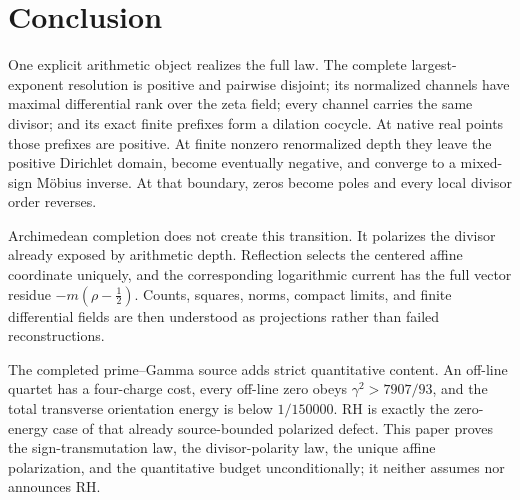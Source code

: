 \documentclass[11pt]{article}
\theoremstyle{definition}
\theoremstyle{remark}
\begin{document}
\section{Conclusion}

One explicit arithmetic object realizes the full law.  The complete largest-exponent resolution
is positive and pairwise disjoint; its normalized channels have maximal differential rank over
the zeta field; every channel carries the same divisor; and its exact finite prefixes form a
dilation cocycle.  At native real points those prefixes are positive.  At finite nonzero
renormalized depth they leave the positive Dirichlet domain, become eventually negative, and
converge to a mixed-sign M\"obius inverse.  At that boundary, zeros become poles and every local
divisor order reverses.

Archimedean completion does not create this transition.  It polarizes the divisor already
exposed by arithmetic depth.  Reflection selects the centered affine coordinate uniquely, and
the corresponding logarithmic current has the full vector residue
\(-m(\rho-\tfrac12)\).  Counts, squares, norms, compact limits, and finite differential fields
are then understood as projections rather than failed reconstructions.

The completed prime--Gamma source adds strict quantitative content.  An off-line quartet has a
four-charge cost, every off-line zero obeys
\(\gamma^2>7907/93\), and the total transverse orientation energy is below \(1/150000\).
RH is exactly the zero-energy case of that already source-bounded polarized defect.  This paper
proves the sign-transmutation law, the divisor-polarity law, the unique affine polarization, and
the quantitative budget unconditionally; it neither assumes nor announces RH.
\end{document}
